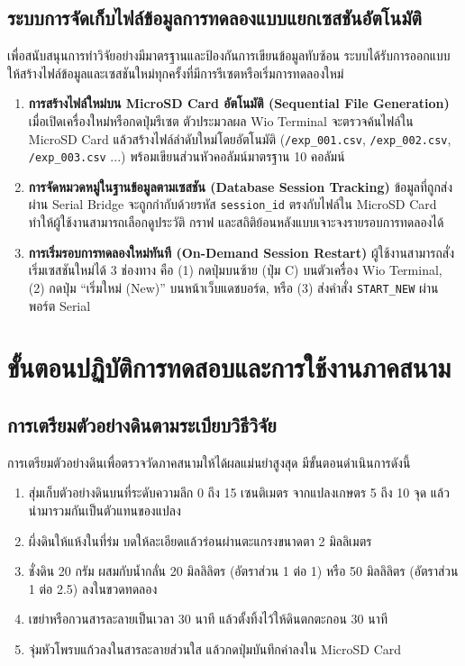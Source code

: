 \documentclass[12pt,a4paper,oneside]{report}
\begin{document}
\section{ระบบการจัดเก็บไฟล์ข้อมูลการทดลองแบบแยกเซสชันอัตโนมัติ}
เพื่อสนับสนุนการทำวิจัยอย่างมีมาตรฐานและป้องกันการเขียนข้อมูลทับซ้อน ระบบได้รับการออกแบบให้สร้างไฟล์ข้อมูลและเซสชันใหม่ทุกครั้งที่มีการรีเซตหรือเริ่มการทดลองใหม่
\begin{enumerate}
    \item \textbf{การสร้างไฟล์ใหม่บน MicroSD Card อัตโนมัติ (Sequential File Generation)} เมื่อเปิดเครื่องใหม่หรือกดปุ่มรีเซต ตัวประมวลผล Wio Terminal จะตรวจค้นไฟล์ใน MicroSD Card แล้วสร้างไฟล์ลำดับใหม่โดยอัตโนมัติ (\texttt{/exp\_001.csv}, \texttt{/exp\_002.csv}, \texttt{/exp\_003.csv} ...) พร้อมเขียนส่วนหัวคอลัมน์มาตรฐาน 10 คอลัมน์
    \item \textbf{การจัดหมวดหมู่ในฐานข้อมูลตามเซสชัน (Database Session Tracking)} ข้อมูลที่ถูกส่งผ่าน Serial Bridge จะถูกกำกับด้วยรหัส \texttt{session\_id} ตรงกับไฟล์ใน MicroSD Card ทำให้ผู้ใช้งานสามารถเลือกดูประวัติ กราฟ และสถิติย้อนหลังแบบเจาะจงรายรอบการทดลองได้
    \item \textbf{การเริ่มรอบการทดลองใหม่ทันที (On-Demand Session Restart)} ผู้ใช้งานสามารถสั่งเริ่มเซสชันใหม่ได้ 3 ช่องทาง คือ (1) กดปุ่มบนซ้าย (ปุ่ม C) บนตัวเครื่อง Wio Terminal, (2) กดปุ่ม ``เริ่มใหม่ (New)'' บนหน้าเว็บแดชบอร์ด, หรือ (3) ส่งคำสั่ง \texttt{START\_NEW} ผ่านพอร์ต Serial
\end{enumerate}

\chapter{ขั้นตอนปฏิบัติการทดสอบและการใช้งานภาคสนาม}

\section{การเตรียมตัวอย่างดินตามระเบียบวิธีวิจัย}
การเตรียมตัวอย่างดินเพื่อตรวจวัดภาคสนามให้ได้ผลแม่นยำสูงสุด มีขั้นตอนดำเนินการดังนี้
\begin{enumerate}
    \item สุ่มเก็บตัวอย่างดินบนที่ระดับความลึก 0 ถึง 15 เซนติเมตร จากแปลงเกษตร 5 ถึง 10 จุด แล้วนำมารวมกันเป็นตัวแทนของแปลง
    \item ผึ่งดินให้แห้งในที่ร่ม บดให้ละเอียดแล้วร่อนผ่านตะแกรงขนาดตา 2 มิลลิเมตร
    \item ชั่งดิน 20 กรัม ผสมกับน้ำกลั่น 20 มิลลิลิตร (อัตราส่วน 1 ต่อ 1) หรือ 50 มิลลิลิตร (อัตราส่วน 1 ต่อ 2.5) ลงในขวดทดลอง
    \item เขย่าหรือกวนสารละลายเป็นเวลา 30 นาที แล้วตั้งทิ้งไว้ให้ดินตกตะกอน 30 นาที
    \item จุ่มหัวโพรบแก้วลงในสารละลายส่วนใส แล้วกดปุ่มบันทึกค่าลงใน MicroSD Card
\end{enumerate}
\end{document}
